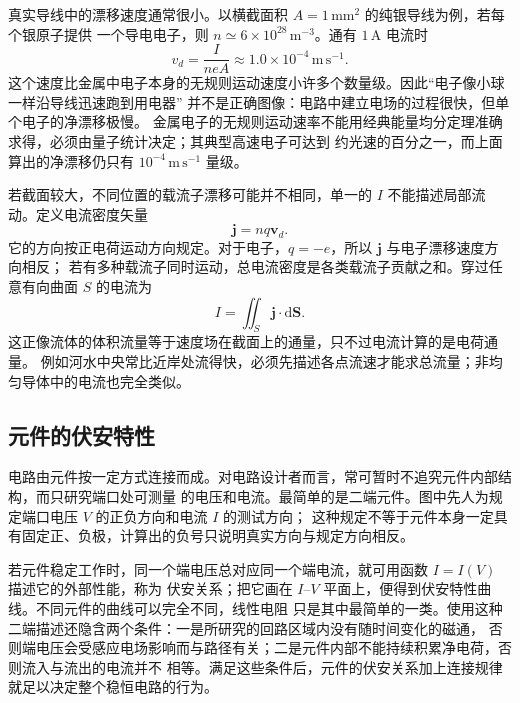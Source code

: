 真实导线中的漂移速度通常很小。以横截面积 $A=1\,\mathrm{mm^2}$ 的纯银导线为例，若每个银原子提供
一个导电电子，则 $n\simeq6\times10^{28}\,\mathrm{m^{-3}}$。通有 $1\,\mathrm A$ 电流时
\begin{equation}
  \boxed{v_d=\frac{I}{neA}\approx1.0\times10^{-4}\,\mathrm{m\,s^{-1}}}.
\end{equation}
这个速度比金属中电子本身的无规则运动速度小许多个数量级。因此“电子像小球一样沿导线迅速跑到用电器”
并不是正确图像：电路中建立电场的过程很快，但单个电子的净漂移极慢。
金属电子的无规则运动速率不能用经典能量均分定理准确求得，必须由量子统计决定；其典型高速电子可达到
约光速的百分之一，而上面算出的净漂移仍只有 $10^{-4}\,\mathrm{m\,s^{-1}}$ 量级。

若截面较大，不同位置的载流子漂移可能并不相同，单一的 $I$ 不能描述局部流动。定义电流密度矢量
\begin{equation}
  \boxed{\boldsymbol j=nq\boldsymbol v_d}.
\end{equation}
它的方向按正电荷运动方向规定。对于电子，$q=-e$，所以 $\boldsymbol j$ 与电子漂移速度方向相反；
若有多种载流子同时运动，总电流密度是各类载流子贡献之和。穿过任意有向曲面 $S$ 的电流为
\[
  I=\iint_S\boldsymbol j\cdot\mathrm d\boldsymbol S.
\]
这正像流体的体积流量等于速度场在截面上的通量，只不过电流计算的是电荷通量。
例如河水中央常比近岸处流得快，必须先描述各点流速才能求总流量；非均匀导体中的电流也完全类似。

\subsection*{元件的伏安特性}

电路由元件按一定方式连接而成。对电路设计者而言，常可暂时不追究元件内部结构，而只研究端口处可测量
的电压和电流。最简单的是二端元件。图中先人为规定端口电压 $V$ 的正负方向和电流 $I$ 的测试方向；
这种规定不等于元件本身一定具有固定正、负极，计算出的负号只说明真实方向与规定方向相反。

\ivCharacteristicFigure
{}

若元件稳定工作时，同一个端电压总对应同一个端电流，就可用函数 $I=I(V)$ 描述它的外部性能，称为
伏安关系；把它画在 $I$--$V$ 平面上，便得到伏安特性曲线。不同元件的曲线可以完全不同，线性电阻
只是其中最简单的一类。使用这种二端描述还隐含两个条件：一是所研究的回路区域内没有随时间变化的磁通，
否则端电压会受感应电场影响而与路径有关；二是元件内部不能持续积累净电荷，否则流入与流出的电流并不
相等。满足这些条件后，元件的伏安关系加上连接规律就足以决定整个稳恒电路的行为。


